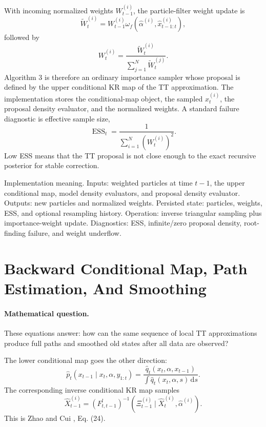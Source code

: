 \documentclass[11pt]{article}
\numberwithin{equation}{section}
\newcommand{\dd}{\,\mathrm d}
\begin{document}
With incoming normalized weights \(W_{t-1}^{(i)}\), the particle-filter weight
update is
\begin{equation}
    \widetilde W_t^{(i)}
    =
    W_{t-1}^{(i)}
    \omega_f(\widehat\alpha^{(i)},\widehat x_{t-1:t}^{(i)}),
    \label{eq:p24-f5}
\end{equation}
followed by
\begin{equation}
    W_t^{(i)}
    =
    \frac{\widetilde W_t^{(i)}}
    {\sum_{j=1}^{N}\widetilde W_t^{(j)}}.
    \label{eq:p24-f6}
\end{equation}
Algorithm 3 is therefore an ordinary importance sampler whose proposal is
defined by the upper conditional KR map of the TT approximation.  The
implementation stores the conditional-map object, the sampled \(x_t^{(i)}\),
the proposal density evaluator, and the normalized weights.  A standard failure
diagnostic is effective sample size,
\begin{equation}
    \operatorname{ESS}_t
    =
    \frac{1}{\sum_{i=1}^{N}(W_t^{(i)})^2}.
    \label{eq:p24-f7}
\end{equation}
Low ESS means that the TT proposal is not close enough to the exact recursive
posterior for stable correction.

Implementation meaning. Inputs: weighted particles at time \(t-1\), the
upper conditional map, model density evaluators, and proposal density evaluator.
Outputs: new particles and normalized weights.  Persisted state: particles,
weights, ESS, and optional resampling history.  Operation: inverse triangular
sampling plus importance-weight update.  Diagnostics: ESS, infinite/zero
proposal density, root-finding failure, and weight underflow.

\section{Backward Conditional Map, Path Estimation, And Smoothing}

\paragraph{Mathematical question.}
These equations answer: how can the same sequence of local TT approximations
produce full paths and smoothed old states after all data are observed?

The lower conditional map goes the other direction:
\begin{equation}
    \widehat p_t(x_{t-1}\mid x_t,\alpha,y_{1:t})
    =
    \frac{\widehat q_t(x_t,\alpha,x_{t-1})}
    {\int \widehat q_t(x_t,\alpha,s)\dd s}.
    \label{eq:p24-b1}
\end{equation}
The corresponding inverse conditional KR map samples
\begin{equation}
    \widehat X_{t-1}^{(i)}
    =
    (F_{t,t-1}^{l})^{-1}
    \left(\Xi_{t-1}^{(i)}\mid \widehat X_t^{(i)},\widehat\alpha^{(i)}\right).
    \label{eq:p24-b2}
\end{equation}
This is Zhao and Cui \cite{zhao2024ttsequential}, Eq. (24).
\end{document}
